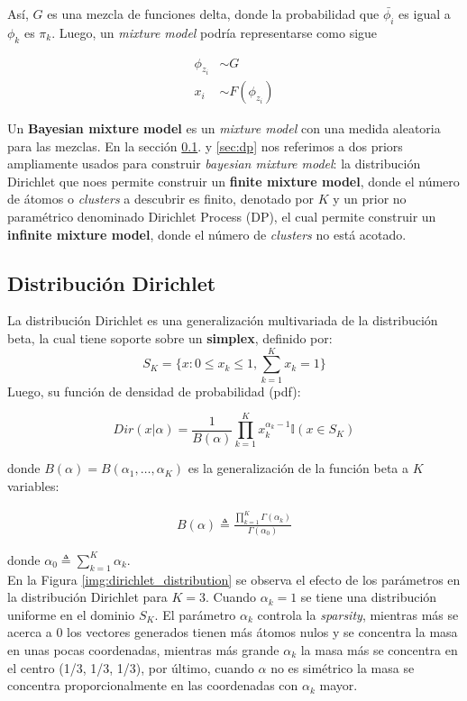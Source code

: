 \documentclass[letterpaper,12pt,oneside]{book} %
\begin{document}
Así, $G$ es una mezcla de funciones delta, donde la probabilidad que $\bar{\phi_{i}}$ es igual a $\phi_{k}$ es $\pi_{k}$. Luego, un \textit{mixture model} podría representarse como sigue

\begin{align}
\phi_{z_{i}} & \sim G\\
x_{i} & \sim  F(\phi_{z_{i}})
\end{align}

Un \textbf{Bayesian mixture model} es un \textit{mixture model} con una medida aleatoria para las mezclas. En la sección \ref{sec:dirichlet}. y \ref{sec:dp} nos referimos a dos priors ampliamente usados para construir \textit{bayesian mixture model}: la distribución Dirichlet que noes permite construir un \textbf{finite mixture model}, donde el número de átomos o \textit{clusters} a descubrir es finito, denotado por $K$ y un prior no paramétrico denominado Dirichlet Process (DP), el cual permite construir un \textbf{infinite mixture model}, donde el número de \textit{clusters} no está acotado. 

\subsection{Distribución Dirichlet}
\label{sec:dirichlet}

La distribución Dirichlet es una generalización multivariada de la distribución beta, la cual tiene soporte sobre un \textbf{simplex}, definido por:
\begin{equation}
    S_{K} = \{x: 0\leq x_{k} \leq 1, \sum_{k=1}^{K}x_{k}=1\}
\end{equation}
Luego, su función de densidad de probabilidad (pdf):

\begin{equation}
    Dir(x|\alpha)=\frac{1}{B(\alpha)}\prod_{k=1}^{K}x_{k}^{\alpha_{k}-1}\mathbb{I}(x\in S_{K})
\end{equation}

donde $B(\alpha) = B(\alpha_{1}, \ldots, \alpha_{K})$ es la generalización de la función beta a $K$ variables:

\begin{align}
    B(\alpha) \triangleq \frac{\prod_{k=1}^{K}\Gamma(\alpha_{k})}{\Gamma(\alpha_{0})}
\end{align}

donde $\alpha_{0} \triangleq \sum_{k=1}^{K}\alpha_{k}$.\\

En la Figura \ref{img:dirichlet_distribution} se observa el efecto de los parámetros en la distribución Dirichlet para $K=3$. Cuando $\alpha_{k}=1$ se tiene una distribución uniforme en el dominio $S_{K}$. El parámetro $\alpha_{k}$ controla la \textit{sparsity}, mientras más se acerca a 0 los vectores generados tienen más átomos nulos y se concentra la masa en unas pocas coordenadas, mientras más grande $\alpha_{k}$ la masa más se concentra en el centro (1/3, 1/3, 1/3), por último, cuando $\alpha$ no es simétrico la masa se concentra proporcionalmente en las coordenadas con $\alpha_{k}$ mayor.\\
\end{document}
